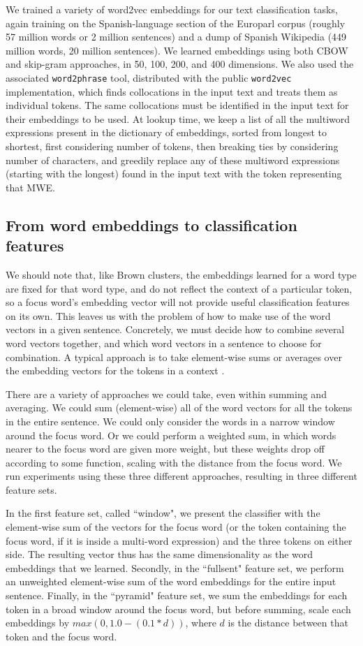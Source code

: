 We trained a variety of word2vec embeddings for our text classification tasks,
again training on the Spanish-language section of the Europarl corpus (roughly
57 million words or 2 million sentences) and a dump of Spanish Wikipedia (449
million words, 20 million sentences). We learned embeddings using both CBOW and
skip-gram approaches, in 50, 100, 200, and 400 dimensions. We also
used the associated \texttt{word2phrase} tool, distributed with the public
\texttt{word2vec} implementation, which finds collocations in the input text
and treats them as individual tokens. The same collocations must be identified
in the input text for their embeddings to be used. At lookup time, we keep a
list of all the multiword expressions present in the dictionary of embeddings,
sorted from longest to shortest, first considering number of tokens, then
breaking ties by considering number of characters, and greedily replace any of
these multiword expressions (starting with the longest) found in the input text
with the token representing that MWE.

\subsection{From word embeddings to classification features}
We should note that, like Brown clusters, the embeddings learned for a word
type are fixed for that word type, and do not reflect the context of a
particular token, so a focus word's embedding vector will not provide useful
classification features on its own. This leaves us with the problem of how to
make use of the word vectors in a given sentence. Concretely, we must decide
how to combine several word vectors together, and which word vectors in a
sentence to choose for combination. A typical approach is to take element-wise
sums or averages over the embedding vectors for the tokens in a context
\cite[Chapter 8]{Goldberg17}.

There are a variety of approaches we could take, even within summing and
averaging. We could sum (element-wise) all of the word vectors for all the
tokens in the entire sentence. We could only consider the words in a narrow
window around the focus word. Or we could perform a weighted sum, in which
words nearer to the focus word are given more weight, but these weights drop
off according to some function, scaling with the distance from the focus word.
We run experiments using these three different approaches, resulting in three
different feature sets.

In the first feature set, called ``window", we present the classifier with the
element-wise sum of the vectors for the focus word (or the token containing the
focus word, if it is inside a multi-word expression) and the three tokens on
either side. The resulting vector thus has the same dimensionality as the word
embeddings that we learned. Secondly, in the ``fullsent" feature set, we
perform an unweighted element-wise sum of the word embeddings for the entire
input sentence. Finally, in the ``pyramid" feature set, we sum the embeddings
for each token in a broad window around the focus word, but before summing,
scale each embeddings by $max(0, 1.0 - (0.1 * d))$, where $d$ is the distance
between that token and the focus word.

